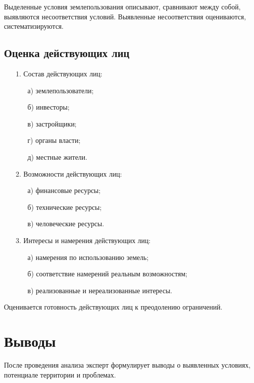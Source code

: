 Выделенные условия землепользования описывают, сравнивают между собой, выявляются несоответствия условий. Выявленные несоответствия оцениваются, систематизируются.

\subsection{Оценка действующих лиц}
\label{subsec:lica}

\begin{enumerate}
    \item[1.] Состав действующих лиц:
    \begin{enumerate}
        \item[а)] землепользователи;
        \item[б)] инвесторы;
        \item[в)] застройщики;
        \item[г)] органы власти;
        \item[д)] местные жители.
    \end{enumerate}
    \item[2.] Возможности действующих лиц:
    \begin{enumerate}
        \item[а)] финансовые ресурсы;
        \item[б)] технические ресурсы;
        \item[в)] человеческие ресурсы.
    \end{enumerate}
    \item[3.] Интересы и намерения действующих лиц:
    \begin{enumerate}
        \item[а)] намерения по использованию земель;
        \item[б)] соответствие намерений реальным возможностям;
        \item[в)] реализованные и нереализованные интересы.
    \end{enumerate}
\end{enumerate}

Оценивается готовность действующих лиц к преодолению ограничений.

\section{Выводы}
\label{sec:end}

После проведения анализа эксперт формулирует выводы о выявленных условиях, потенциале территории и проблемах.

